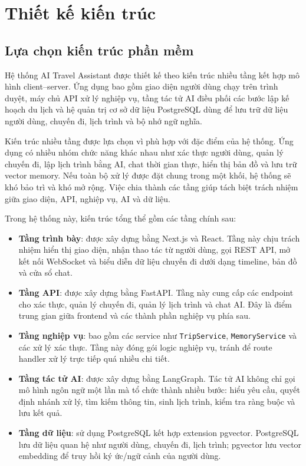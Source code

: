 \documentclass[../DoAn.tex]{subfiles}
\begin{document}
\section{Thiết kế kiến trúc}

\subsection{Lựa chọn kiến trúc phần mềm}

Hệ thống AI Travel Assistant được thiết kế theo kiến trúc nhiều tầng kết hợp mô hình client--server. Ứng dụng bao gồm giao diện người dùng chạy trên trình duyệt, máy chủ API xử lý nghiệp vụ, tầng tác tử AI điều phối các bước lập kế hoạch du lịch và hệ quản trị cơ sở dữ liệu PostgreSQL dùng để lưu trữ dữ liệu người dùng, chuyến đi, lịch trình và bộ nhớ ngữ nghĩa.

Kiến trúc nhiều tầng được lựa chọn vì phù hợp với đặc điểm của hệ thống. Ứng dụng có nhiều nhóm chức năng khác nhau như xác thực người dùng, quản lý chuyến đi, lập lịch trình bằng AI, chat thời gian thực, hiển thị bản đồ và lưu trữ vector memory. Nếu toàn bộ xử lý được đặt chung trong một khối, hệ thống sẽ khó bảo trì và khó mở rộng. Việc chia thành các tầng giúp tách biệt trách nhiệm giữa giao diện, API, nghiệp vụ, AI và dữ liệu.

Trong hệ thống này, kiến trúc tổng thể gồm các tầng chính sau:

\begin{itemize}
    \item \textbf{Tầng trình bày}: được xây dựng bằng Next.js và React. Tầng này chịu trách nhiệm hiển thị giao diện, nhận thao tác từ người dùng, gọi REST API, mở kết nối WebSocket và biểu diễn dữ liệu chuyến đi dưới dạng timeline, bản đồ và cửa sổ chat.
    \item \textbf{Tầng API}: được xây dựng bằng FastAPI. Tầng này cung cấp các endpoint cho xác thực, quản lý chuyến đi, quản lý lịch trình và chat AI. Đây là điểm trung gian giữa frontend và các thành phần nghiệp vụ phía sau.
    \item \textbf{Tầng nghiệp vụ}: bao gồm các service như \texttt{TripService}, \texttt{MemoryService} và các xử lý xác thực. Tầng này đóng gói logic nghiệp vụ, tránh để route handler xử lý trực tiếp quá nhiều chi tiết.
    \item \textbf{Tầng tác tử AI}: được xây dựng bằng LangGraph. Tác tử AI không chỉ gọi mô hình ngôn ngữ một lần mà tổ chức thành nhiều bước: hiểu yêu cầu, quyết định nhánh xử lý, tìm kiếm thông tin, sinh lịch trình, kiểm tra ràng buộc và lưu kết quả.
    \item \textbf{Tầng dữ liệu}: sử dụng PostgreSQL kết hợp extension pgvector. PostgreSQL lưu dữ liệu quan hệ như người dùng, chuyến đi, lịch trình; pgvector lưu vector embedding để truy hồi ký ức/ngữ cảnh của người dùng.
\end{itemize}
\end{document}
